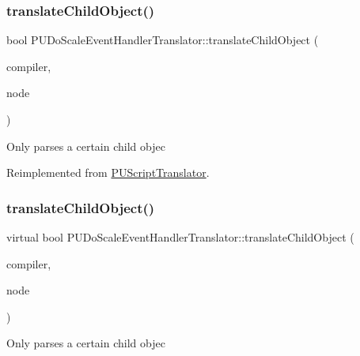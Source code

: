 \subsubsection{\texorpdfstring{translate\+Child\+Object()}{translateChildObject()}\hspace{0.1cm}{\footnotesize\ttfamily [1/2]}}
{\footnotesize\ttfamily bool P\+U\+Do\+Scale\+Event\+Handler\+Translator\+::translate\+Child\+Object (\begin{DoxyParamCaption}\item[{\hyperlink{classPUScriptCompiler}{P\+U\+Script\+Compiler} $\ast$}]{compiler,  }\item[{\hyperlink{classPUAbstractNode}{P\+U\+Abstract\+Node} $\ast$}]{node }\end{DoxyParamCaption})\hspace{0.3cm}{\ttfamily [virtual]}}

Only parses a certain child objec 

Reimplemented from \hyperlink{classPUScriptTranslator_ab587d01348ae3e678cb700c719b2b113}{P\+U\+Script\+Translator}.

\mbox{\label{classPUDoScaleEventHandlerTranslator_af1851f6fa9b9f6e9924979dbd0e68351}} 
\subsubsection{\texorpdfstring{translate\+Child\+Object()}{translateChildObject()}\hspace{0.1cm}{\footnotesize\ttfamily [2/2]}}
{\footnotesize\ttfamily virtual bool P\+U\+Do\+Scale\+Event\+Handler\+Translator\+::translate\+Child\+Object (\begin{DoxyParamCaption}\item[{\hyperlink{classPUScriptCompiler}{P\+U\+Script\+Compiler} $\ast$}]{compiler,  }\item[{\hyperlink{classPUAbstractNode}{P\+U\+Abstract\+Node} $\ast$}]{node }\end{DoxyParamCaption})\hspace{0.3cm}{\ttfamily [virtual]}}

Only parses a certain child objec 

